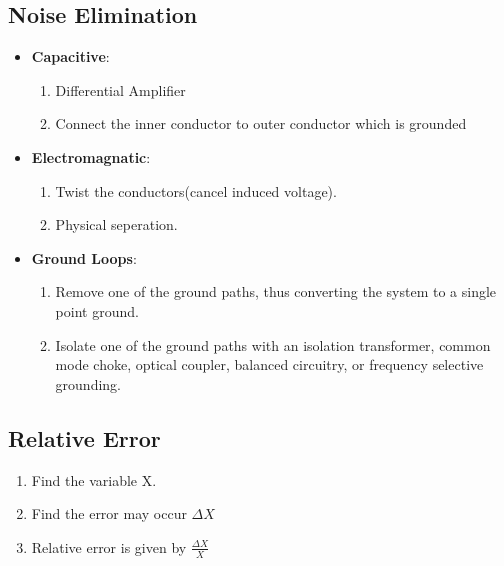 \documentclass{article}
\begin{document}
  \subsection{Noise Elimination}
  \begin{itemize}
  \item \textbf{Capacitive}: \begin{enumerate}
  \item Differential Amplifier
  \item Connect the inner conductor to outer conductor which is grounded
  \end{enumerate}
  
  \item \textbf{Electromagnatic}: \begin{enumerate}
  \item Twist the conductors(cancel induced voltage).
  \item Physical seperation.
  \end{enumerate}
  
  \item \textbf{Ground Loops}: \begin{enumerate}
  \item Remove one of the ground paths, thus converting the system to a single point ground.
  
  \item Isolate one of the ground paths with an isolation transformer, common mode choke, optical coupler, balanced circuitry, or frequency selective grounding.
  \end{enumerate}
  \end{itemize}
  \subsection{Relative Error}
  \begin{enumerate}
  \item Find the variable X.
  \item Find the error may occur $\Delta X$
  \item Relative error is given by $\frac{\Delta X}{X}$ 
\end{enumerate}    
  
  
\end{document}
